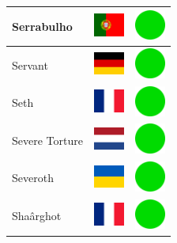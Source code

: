 \documentclass[12pt, a4paper, twoside]{report}
\begin{document}
\begin{center}
\begin{longtable}{|p{5cm}|p{2cm}|p{2cm}|}
 Serrabulho                                                 & \includegraphics[width=1cm]{../4x3/pt} &   \includegraphics[width=1cm]{../likes/y} \\ \hline
 Servant                                                    & \includegraphics[width=1cm]{../4x3/de} &   \includegraphics[width=1cm]{../likes/y} \\ \hline
 Seth                                                       & \includegraphics[width=1cm]{../4x3/fr} &   \includegraphics[width=1cm]{../likes/y} \\ \hline
 Severe Torture                                             & \includegraphics[width=1cm]{../4x3/nl} &   \includegraphics[width=1cm]{../likes/y} \\ \hline
 Severoth                                                   & \includegraphics[width=1cm]{../4x3/ua} &   \includegraphics[width=1cm]{../likes/y} \\ \hline
 Shaârghot                                                  & \includegraphics[width=1cm]{../4x3/fr} &   \includegraphics[width=1cm]{../likes/y} \\ \hline

\end{longtable}
\end{center}
\end{document}
